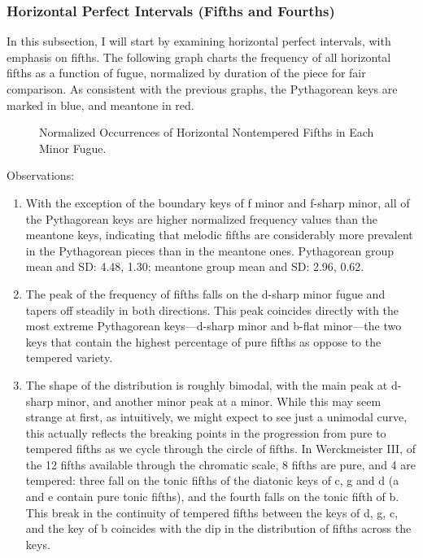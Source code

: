     \subsubsection{Horizontal Perfect Intervals (Fifths and
Fourths)}\label{horizontal-perfect-intervals-fifths-and-fourths}

In this subsection, I will start by examining horizontal perfect
intervals, with emphasis on fifths. The following graph charts the
frequency of all horizontal fifths as a function of fugue, normalized by
duration of the piece for fair comparison. As consistent with the
previous graphs, the Pythagorean keys are marked in blue, and meantone
in red.




\begin{figure}[H]
\vspace{1.5em}
    \centering
    \caption{Normalized Occurrences of Horizontal Nontempered Fifths in Each Minor Fugue. }
\end{figure}    Observations:

\begin{enumerate}
\def\labelenumi{\arabic{enumi}.}
\tightlist
\item
  With the exception of the boundary keys of f minor and f-sharp minor,
  all of the Pythagorean keys are higher normalized frequency values
  than the meantone keys, indicating that melodic fifths are
  considerably more prevalent in the Pythagorean pieces than in the
  meantone ones. Pythagorean group mean and SD: 4.48, 1.30; meantone
  group mean and SD: 2.96, 0.62.
\item
  The peak of the frequency of fifths falls on the d-sharp minor fugue
  and tapers off steadily in both directions. This peak coincides
  directly with the most extreme Pythagorean keys---d-sharp minor
  and b-flat minor---the two keys that contain the highest
  percentage of pure fifths as oppose to the tempered variety.
\item
  The shape of the distribution is roughly bimodal, with the main peak
  at d-sharp minor, and another minor peak at a minor. While this may
  seem strange at first, as intuitively, we might expect to see just a
  unimodal curve, this actually reflects the breaking points in the
  progression from pure to tempered fifths as we cycle through the
  circle of fifths. In Werckmeister III, of the 12 fifths available
  through the chromatic scale, 8 fifths are pure, and 4 are tempered:
  three fall on the tonic fifths of the diatonic keys of c, g and d (a
  and e contain pure tonic fifths), and the fourth falls on the tonic
  fifth of b. This break in the continuity of tempered fifths between
  the keys of d, g, c, and the key of b coincides with the dip in the
  distribution of fifths across the keys.
\end{enumerate}

